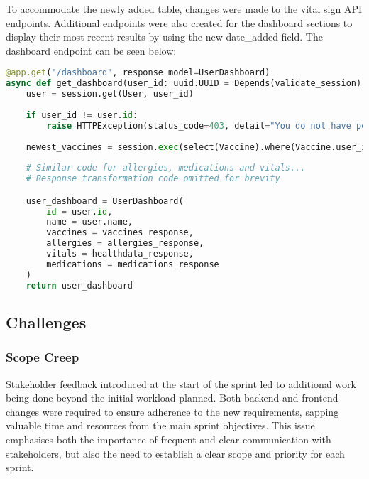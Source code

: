 To accommodate the newly added table, changes were made to the vital sign API endpoints. Additional endpoints were also created for the dashboard sections to display their most recent results by using the new date\_added field. The dashboard endpoint can be seen below:

\begin{lstlisting}[language=Python, caption=Dashboard Endpoint]
@app.get("/dashboard", response_model=UserDashboard)
async def get_dashboard(user_id: uuid.UUID = Depends(validate_session), session: Session = Depends(get_session)):
    user = session.get(User, user_id)
    
    if user_id != user.id:
        raise HTTPException(status_code=403, detail="You do not have permission to access this endpoint!")   
    
    newest_vaccines = session.exec(select(Vaccine).where(Vaccine.user_id == user_id).order_by(col(Vaccine.date_added).desc()).limit(5)).all()
    
    # Similar code for allergies, medications and vitals...
    # Response transformation code omitted for brevity

    user_dashboard = UserDashboard(
        id = user.id,
        name = user.name,
        vaccines = vaccines_response,
        allergies = allergies_response,
        vitals = healthdata_response,
        medications = medications_response
    )
    return user_dashboard
\end{lstlisting}

\noindent\begin{minipage}{\textwidth}
  \begin{center}
      \label{fig:erd_s3}
  \end{center}
\end{minipage}

\subsection{Challenges}

\subsubsection{Scope Creep}

Stakeholder feedback introduced at the start of the sprint led to additional work being done beyond the initial workload planned. Both backend and frontend changes were required to ensure adherence to the new requirements, sapping valuable time and resources from the main sprint objectives. This issue emphasises both the importance of frequent and clear communication with stakeholders, but also the need to establish a clear scope and priority for each sprint.

